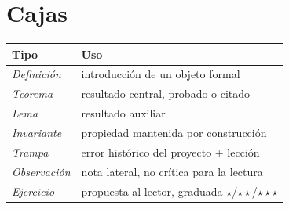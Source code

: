 \section*{Cajas}

\begin{tabularx}{\linewidth}{l X}
  \toprule
  Tipo & Uso \\
  \midrule
  \emph{Definición} & introducción de un objeto formal \\
  \emph{Teorema} & resultado central, probado o citado \\
  \emph{Lema} & resultado auxiliar \\
  \emph{Invariante} & propiedad mantenida por construcción \\
  \emph{Trampa} & error histórico del proyecto + lección \\
  \emph{Observación} & nota lateral, no crítica para la lectura \\
  \emph{Ejercicio} & propuesta al lector, graduada $\star$/$\star\star$/$\star\star\star$ \\
  \bottomrule
\end{tabularx}

\clearpage
